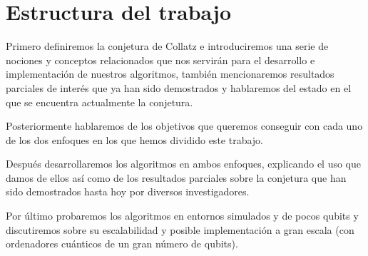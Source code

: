 \section{Estructura del trabajo}
Primero definiremos la conjetura de Collatz e introduciremos una serie de nociones y conceptos relacionados que nos servirán para el desarrollo e implementación de nuestros algoritmos, también mencionaremos resultados parciales de interés que ya han sido demostrados y hablaremos del estado en el que se encuentra actualmente la conjetura.

Posteriormente hablaremos de los objetivos que queremos conseguir con cada uno de los dos enfoques en los que hemos dividido este trabajo.

Después desarrollaremos los algoritmos en ambos enfoques, explicando el uso que damos de ellos así como de los resultados parciales sobre la conjetura que han sido demostrados hasta hoy por diversos investigadores.

Por último probaremos los algoritmos en entornos simulados y de pocos qubits y discutiremos sobre su escalabilidad y posible implementación a gran escala (con ordenadores cuánticos de un gran número de qubits).